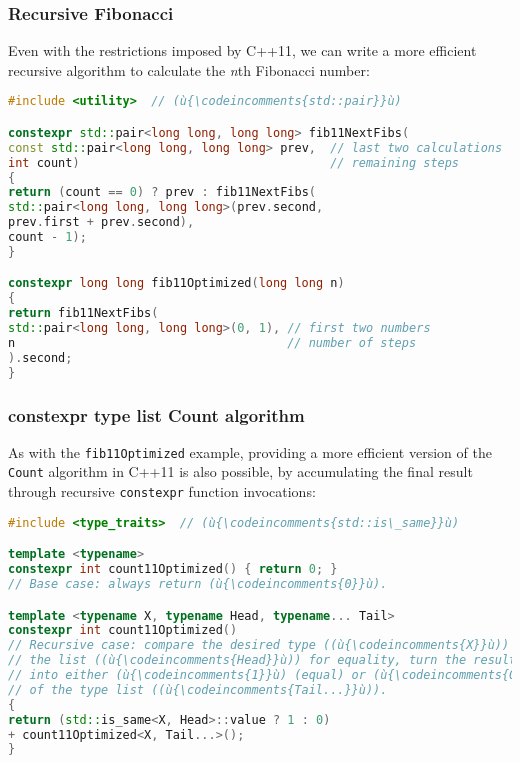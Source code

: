 \subsubsection[Recursive Fibonacci]{Recursive Fibonacci}\label{recursive-fibonacci}

Even with the restrictions imposed by C++11, we can write a
more efficient recursive algorithm to calculate the \emph{n\/}th
Fibonacci number:

\begin{lstlisting}[language=C++]
#include <utility>  // (ù{\codeincomments{std::pair}}ù)

constexpr std::pair<long long, long long> fib11NextFibs(
const std::pair<long long, long long> prev,  // last two calculations
int count)                                   // remaining steps
{
return (count == 0) ? prev : fib11NextFibs(
std::pair<long long, long long>(prev.second,
prev.first + prev.second),
count - 1);
}

constexpr long long fib11Optimized(long long n)
{
return fib11NextFibs(
std::pair<long long, long long>(0, 1), // first two numbers
n                                      // number of steps
).second;
}
\end{lstlisting}


\subsubsection[{\ttfamily constexpr} type list {\ttfamily Count} algorithm]{{\SubsubsecCode constexpr} type list {\SubsubsecCode Count} algorithm}\label{constexpr-typelist-count-algorithm}

As with the \texttt{fib11Optimized} example, providing a more efficient version of the \texttt{Count} algorithm in
C++11 is also possible, by accumulating the final result through recursive
\texttt{constexpr} function invocations:

\begin{lstlisting}[language=C++]
#include <type_traits>  // (ù{\codeincomments{std::is\_same}}ù)

template <typename>
constexpr int count11Optimized() { return 0; }
// Base case: always return (ù{\codeincomments{0}}ù).

template <typename X, typename Head, typename... Tail>
constexpr int count11Optimized()
// Recursive case: compare the desired type ((ù{\codeincomments{X}}ù)) and the first type in
// the list ((ù{\codeincomments{Head}}ù)) for equality, turn the result of the comparison
// into either (ù{\codeincomments{1}}ù) (equal) or (ù{\codeincomments{0}}ù) (not equal), and recurse with the rest
// of the type list ((ù{\codeincomments{Tail...}}ù)).
{
return (std::is_same<X, Head>::value ? 1 : 0)
+ count11Optimized<X, Tail...>();
}
\end{lstlisting}

